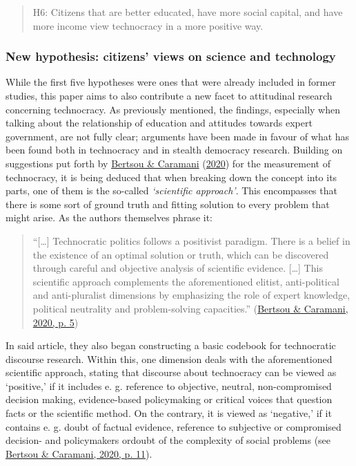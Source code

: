 \documentclass[
  12pt,
  english,
]{article}
\begin{document}
\begin{quote}
H6: Citizens that are better educated, have more social capital, and
have more income view technocracy in a more positive way.
\end{quote}

\hypertarget{new-hypothesis-citizens-views-on-science-and-technology}{%
\subsubsection{New hypothesis: citizens' views on science and
technology}\label{new-hypothesis-citizens-views-on-science-and-technology}}

While the first five hypotheses were ones that were already included in
former studies, this paper aims to also contribute a new facet to
attitudinal research concerning technocracy. As previously mentioned,
the findings, especially when talking about the relationship of
education and attitudes towards expert government, are not fully clear;
arguments have been made in favour of what has been found both in
technocracy and in stealth democracy research. Building on suggestions
put forth by \protect\hyperlink{ref-bertsou2020measuring}{Bertsou \&
Caramani} (\protect\hyperlink{ref-bertsou2020measuring}{2020}) for the
measurement of technocracy, it is being deduced that when breaking down
the concept into its parts, one of them is the so-called
\emph{`scientific approach'}. This encompasses that there is some sort
of ground truth and fitting solution to every problem that might arise.
As the authors themselves phrase it:

\begin{quote}
``{[}\ldots{]} Technocratic politics follows a positivist paradigm.
There is a belief in the existence of an optimal solution or truth,
which can be discovered through careful and objective analysis of
scientific evidence. {[}\ldots{]} This scientific approach complements
the aforementioned elitist, anti-political and anti-pluralist dimensions
by emphasizing the role of expert knowledge, political neutrality and
problem-solving capacities.''
(\protect\hyperlink{ref-bertsou2020measuring}{Bertsou \& Caramani, 2020,
p. 5})
\end{quote}

In said article, they also began constructing a basic codebook for
technocratic discourse research. Within this, one dimension deals with
the aforementioned scientific approach, stating that discourse about
technocracy can be viewed as `positive,' if it includes e. g. reference
to objective, neutral, non-compromised decision making, evidence-based
policymaking or critical voices that question facts or the scientific
method. On the contrary, it is viewed as `negative,' if it contains e.
g. doubt of factual evidence, reference to subjective or compromised
decision- and policymakers ordoubt of the complexity of social problems
(see \protect\hyperlink{ref-bertsou2020measuring}{Bertsou \& Caramani,
2020, p. 11}).
\end{document}
